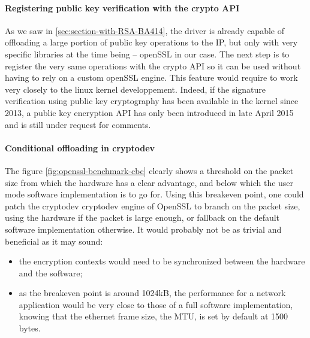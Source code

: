 \paragraph{Registering public key verification with the crypto API}
As we saw in \ref{sec:section-with-RSA-BA414}, the driver is already capable of offloading a large portion of public key operations to the IP, but only with very specific libraries at the time being -- openSSL in our case.
The next step is to register the very same operations with the crypto API so it can be used without having to rely on a custom openSSL engine.
This feature would require to work very closely to the linux kernel developpement.
Indeed, if the signature verification using public key cryptography has been available in the kernel since 2013, a public key encryption API has only been introduced in late April 2015~\cite{cyrpto-api-pk-encryption} and is still under request for comments.

\paragraph{Conditional offloading in cryptodev}
The figure \ref{fig:openssl-benchmark-cbc} clearly shows a threshold on the packet size from which the hardware has a clear advantage, and below which the user mode software implementation is to go for.
Using this breakeven point, one could patch the cryptodev cryptodev engine of OpenSSL to branch on the packet size, using the hardware if the packet is large enough, or fallback on the default software implementation otherwise. %
It would probably not be as trivial and beneficial as it may sound:
\begin{itemize}
	\item the encryption contexts would need to be synchronized between the hardware and the software;
	\item as the breakeven point is around 1024kB, the performance for a network application would be very close to those of a full software implementation, knowing that the ethernet frame size, the MTU, is set by default at 1500 bytes.
\end{itemize}

